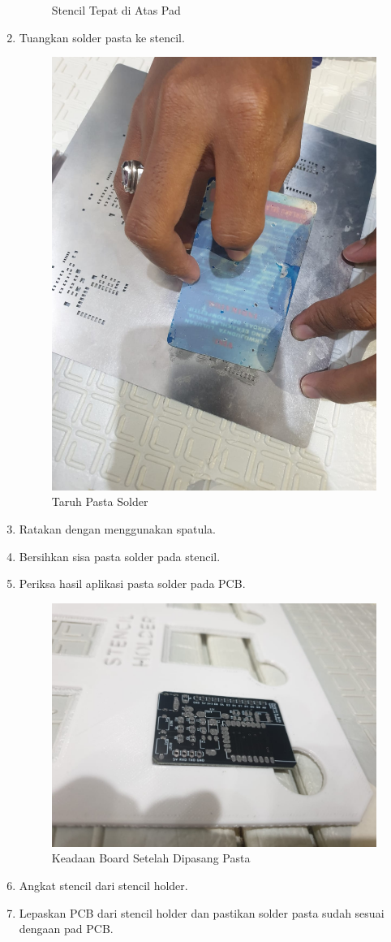 \begin{enumerate}
\begin{figure}[H]
        \caption{Stencil Tepat di Atas Pad}
        \label{fig:StencilTepatdiAtasPad}
    \end{figure}
    \item Tuangkan solder pasta ke stencil.
    \begin{figure}[H]
        \centering
        \includegraphics[width=0.4\linewidth]{P4/img/3_taruh_solder_pasta_lalu_ratakan.jpeg}
        \caption{Taruh Pasta Solder}
        \label{fig:TaruhPastaSolder}
    \end{figure}
    \item Ratakan dengan menggunakan spatula.
    \item Bersihkan sisa pasta solder pada stencil.
    \item Periksa hasil aplikasi pasta solder pada PCB.
    \begin{figure}[H]
        \centering
        \includegraphics[width=0.4\linewidth]{P4/img/4_keadaan_board_setelah_dipasang_pasta.jpeg}
        \caption{Keadaan Board Setelah Dipasang Pasta}
        \label{fig:KeadaanBoardSetelahPasta}
    \end{figure}
    \item Angkat stencil dari stencil holder.
    \item Lepaskan PCB dari stencil holder dan pastikan solder pasta sudah sesuai dengaan pad PCB.
\end{enumerate}

